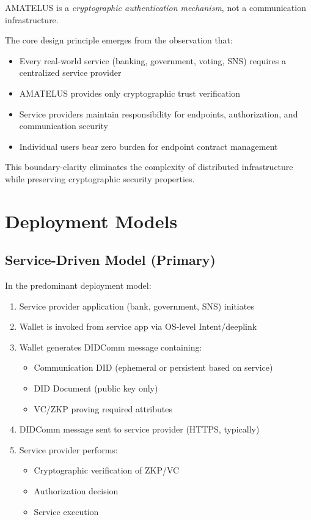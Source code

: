 AMATELUS is a \emph{cryptographic authentication mechanism}, not a communication infrastructure.

The core design principle emerges from the observation that:
\begin{itemize}
  \item Every real-world service (banking, government, voting, SNS) requires a centralized service provider
  \item AMATELUS provides only cryptographic trust verification
  \item Service providers maintain responsibility for endpoints, authorization, and communication security
  \item Individual users bear zero burden for endpoint contract management
\end{itemize}

This boundary-clarity eliminates the complexity of distributed infrastructure while preserving cryptographic security properties.

\chapter{Deployment Models}

\section{Service-Driven Model (Primary)}

In the predominant deployment model:
\begin{enumerate}
  \item Service provider application (bank, government, SNS) initiates
  \item Wallet is invoked from service app via OS-level Intent/deeplink
  \item Wallet generates DIDComm message containing:
    \begin{itemize}
      \item Communication DID (ephemeral or persistent based on service)
      \item DID Document (public key only)
      \item VC/ZKP proving required attributes
    \end{itemize}
  \item DIDComm message sent to service provider (HTTPS, typically)
  \item Service provider performs:
    \begin{itemize}
      \item Cryptographic verification of ZKP/VC
      \item Authorization decision
      \item Service execution
    \end{itemize}
\end{enumerate}

